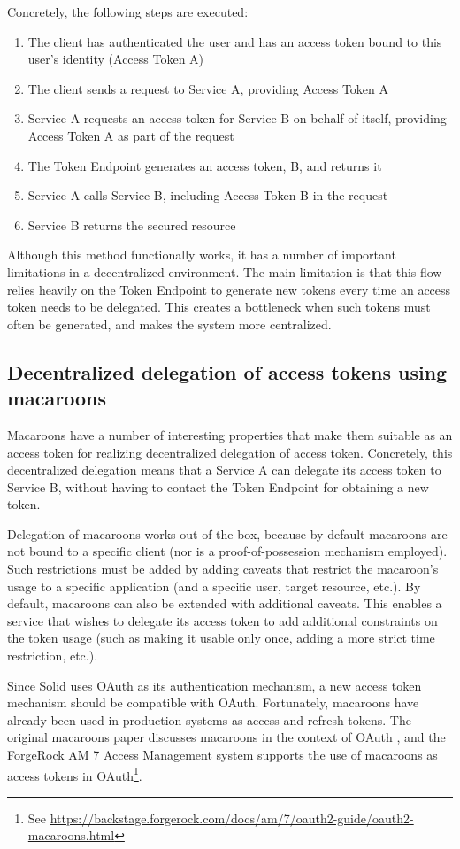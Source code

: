 \noindent Concretely, the following steps are executed:
\begin{enumerate}
    \item The client has authenticated the user and has an access token bound to this user's identity (Access Token A)
    \item The client sends a request to Service A, providing Access Token A
    \item Service A requests an access token for Service B on behalf of itself, providing Access Token A as part of the request
    \item The Token Endpoint generates an access token, B, and returns it
    \item Service A calls Service B, including Access Token B in the request
    \item Service B returns the secured resource
\end{enumerate}
\noindent Although this method functionally works, it has a number of important limitations in a decentralized environment. The main limitation is that this flow relies heavily on the Token Endpoint to generate new tokens every time an access token needs to be delegated. This creates a bottleneck when such tokens must often be generated, and makes the system more centralized. 

\newpage
\subsection{Decentralized delegation of access tokens using macaroons}
Macaroons have a number of interesting properties that make them suitable as an access token for realizing decentralized delegation of access token. Concretely, this decentralized delegation means that a Service A can delegate its access token to Service B, without having to contact the Token Endpoint for obtaining a new token.

Delegation of macaroons works out-of-the-box, because by default macaroons are not bound to a specific client (nor is a proof-of-possession mechanism employed). Such restrictions must be added by adding caveats that restrict the macaroon's usage to a specific application (and a specific user, target resource, etc.). By default, macaroons can also be extended with additional caveats. This enables a service that wishes to delegate its access token to add additional constraints on the token usage (such as making it usable only once, adding a more strict time restriction, etc.).

Since Solid uses OAuth as its authentication mechanism, a new access token mechanism should be compatible with OAuth. Fortunately, macaroons have already been used in production systems as access and refresh tokens. The original macaroons paper discusses macaroons in the context of OAuth \citep[p.12]{macaroons}, and the ForgeRock AM 7 Access Management system supports the use of macaroons as access tokens in OAuth\footnote{See \url{https://backstage.forgerock.com/docs/am/7/oauth2-guide/oauth2-macaroons.html}}.

